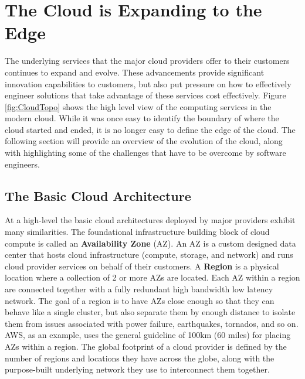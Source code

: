 \documentclass[conference]{IEEEtran}
\begin{document}
\section{The Cloud is Expanding to the Edge}
\label{sec:CloudArchitecture}


The underlying services that the major cloud providers offer to their customers continues to expand and evolve.  These advancements provide significant innovation capabilities to customers, but also put pressure on how to effectively engineer solutions that take advantage of these services cost effectively.  Figure \ref{fig:CloudTopo} shows the high level view of the computing services in the modern cloud.  While it was once easy to identify the boundary of where the cloud started and ended, it is no longer easy to define the edge of the cloud.  The following section will provide an overview of the evolution of the cloud, along with highlighting some of the challenges that have to be overcome by software engineers.

\subsection{The Basic Cloud Architecture}
\label{subsec:BasicCloudArchitecture}

At a high-level the basic cloud architectures deployed by major providers exhibit many similarities.  The foundational infrastructure building block of cloud compute is called an \textbf{Availability Zone} (AZ).  An AZ is a custom designed data center that hosts cloud infrastructure (compute, storage, and network) and runs cloud provider services on behalf of their customers.  A \textbf{Region} is a physical location where a collection of 2 or more AZs are located.  Each AZ within a region are connected together with a fully redundant high bandwidth low latency network.  The goal of a region is to have AZs close enough so that they can behave like a single cluster, but also separate them by enough distance to isolate them from issues associated with power failure, earthquakes, tornados, and so on.  AWS, as an example, uses the general guideline of 100km (60 miles)\cite{AWS-AZ} for placing AZs within a region. The global footprint of a cloud provider is defined by the number of regions and locations they have across the globe, along with the purpose-built underlying network they use to interconnect them together. 
\end{document}
